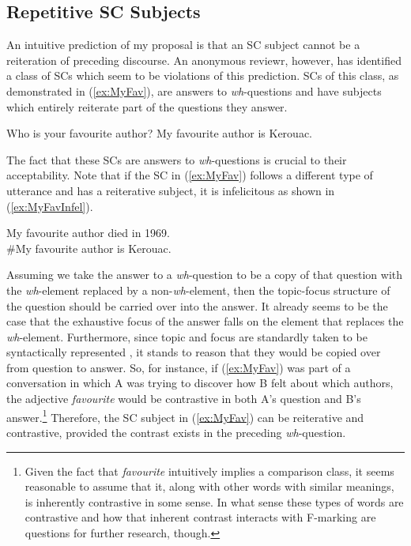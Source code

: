 \documentclass[
	letterpaper,
]{article}
\begin{document}
\subsection{Repetitive SC Subjects}
An intuitive prediction of my proposal is that an SC subject cannot be a reiteration of preceding discourse.
An anonymous reviewr, however, has identified a class of SCs which seem to be violations of this prediction.
SCs of this class, as demonstrated in (\ref{ex:MyFav}), are answers to \textit{wh}-questions and have subjects which entirely reiterate part of the questions they answer.
\begin{exe}
	\ex\label{ex:MyFav}
	\begin{xlist}
		 Who is your favourite author?
		 My favourite author is Kerouac.
	\end{xlist}
\end{exe}
The fact that these SCs are answers to \textit{wh}-questions is crucial to their acceptability.
Note that if the SC in (\ref{ex:MyFav}) follows a different type of utterance and has a reiterative subject, it is infelicitous as shown in (\ref{ex:MyFavInfel}).
\begin{exe}
	\ex\label{ex:MyFavInfel} My favourite author died in 1969.\\
	\#My favourite author is Kerouac.
\end{exe}
Assuming we take the answer to a \textit{wh}-question to be a copy of that question with the \textit{wh}-element replaced by a non-\textit{wh}-element, then the topic-focus structure of the question should be carried over into the answer.
It already seems to be the case that the exhaustive focus of the answer falls on the element that replaces the \textit{wh}-element.
Furthermore, since topic and focus are standardly taken to be syntactically represented \parencite{rizzi1997fine}, it stands to reason that they would be copied over from question to answer.
So, for instance, if (\ref{ex:MyFav}) was part of a conversation in which A was trying to discover how B felt about which authors, the adjective \textit{favourite} would be contrastive in both A's question and B's answer.\footnote{
	Given the fact that \textit{favourite} intuitively implies a comparison class, it seems reasonable to assume that it, along with other words with similar meanings, is inherently contrastive in some sense.
	In what sense these types of words are contrastive and how that inherent contrast interacts with F-marking are questions for further research, though.
}
Therefore, the SC subject in (\ref{ex:MyFav}) can be reiterative and contrastive, provided the contrast exists in the preceding \textit{wh}-question.
\end{document}
